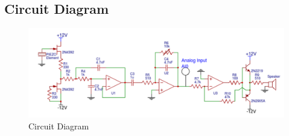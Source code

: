 \documentclass{article}
\begin{document}
    \subsection{Circuit Diagram}
        \begin{figure}[H]
            \centering
            \includegraphics[scale = 0.6]{circuitFinal.png}
            \caption{Circuit Diagram}
            \label{fig:my_label}
        \end{figure}
\end{document}
